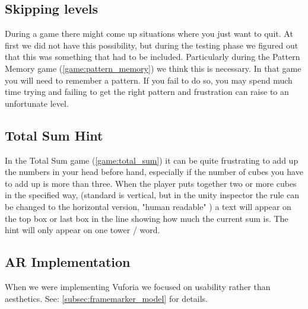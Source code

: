 \subsection{Skipping levels}
During a game there might come up situations where you just want to quit. At
first we did not have this possibility, but during the testing phase we figured
out that this was something that had to be included. Particularly during the
Pattern Memory game (\ref{game:pattern_memory}) we think this is necessary. In
that game you will need to remember a pattern. If you fail to do so, you may
spend much time trying and failing to get the right pattern and frustration can
raise to an unfortunate level. 

\subsection{Total Sum Hint}
In the Total Sum game (\ref{game:total_sum}) it can be quite frustrating to add up the numbers in your head before hand, especially if the number of cubes you have to add up is more than three. When the player puts together two or more cubes in the specified way, (standard is vertical, but in the unity inspector the rule can be changed to the horizontal version, "human readable" ) a text will appear on the top box or last box in the line showing how much the current sum is. The hint will only appear on one tower / word.

\subsection{AR Implementation}
When we were implementing Vuforia we focused on usability rather than aesthetics.
See: \ref{subsec:framemarker_model} for details.


